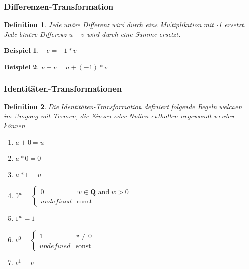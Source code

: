 \documentclass[11pt]{article}
\newtheorem{defin}{Definition}
\newtheorem{example}{Beispiel}
\begin{document}
\subsubsection{Differenzen-Transformation}
\begin{defin}
\label{def:differenzen_transformation}
Jede unäre Differenz wird durch eine Multiplikation mit -1 ersetzt. 
Jede binäre Differenz $u-v$ wird durch eine Summe ersetzt.
\end{defin}

\begin{example} \normalfont
  $-v = -1 * v$
\end{example}
  
\begin{example} \normalfont
  $u - v = u + (-1) * v $
\end{example}

\subsubsection{Identitäten-Transformationen}

\begin{defin}
  \label{def:identitaeten_transformation}
  Die Identitäten-Transformation definiert folgende Regeln welchen im Umgang mit Termen, die
  Einsen oder Nullen enthalten angewandt werden können
  \begin{enumerate}
    \item $u+0 = u$
    \item $u*0 = 0$
    \item $u*1 = u$
    \item $
            0^w = \left\{
                \begin{array}{ll}
                    0         & w \in \mathbf{Q} \textrm{ and } w > 0 \\
                    undefined & \textrm{sonst}
                \end{array}
            \right.$
    \item $1^w = 1$
    \item $
          v^0 = \left\{
              \begin{array}{ll}
                  1         & v \neq 0 \\
                  undefined & \textrm{sonst}
              \end{array}
          \right.
          $
    \item $v^1 = v$
  \end{enumerate}
\end{defin}
\end{document}
